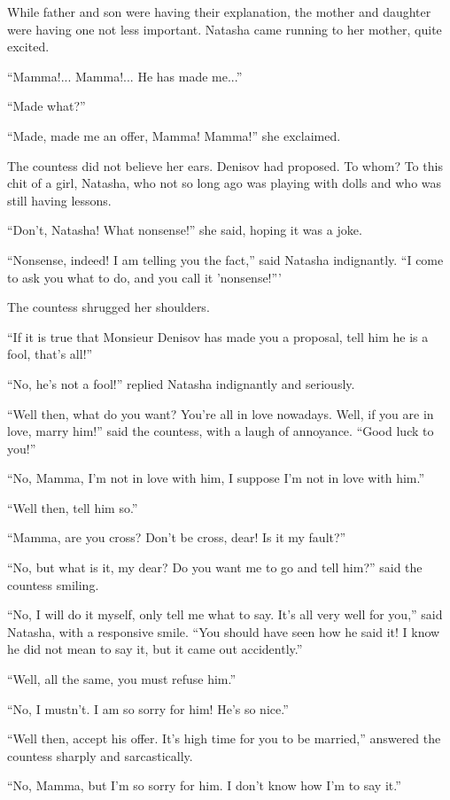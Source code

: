 While father and son were having their explanation, the mother
and daughter were having one not less important. Natasha came
running to her mother, quite excited.

``Mamma!... Mamma!... He has made me...''

``Made what?''

``Made, made me an offer, Mamma! Mamma!'' she exclaimed.

The countess did not believe her ears. Denisov had proposed. To
whom? To this chit of a girl, Natasha, who not so long ago was
playing with dolls and who was still having lessons.

``Don't, Natasha! What nonsense!'' she said, hoping it was a
joke.

``Nonsense, indeed! I am telling you the fact,'' said Natasha
indignantly.  ``I come to ask you what to do, and you call it
'nonsense!'''

The countess shrugged her shoulders.

``If it is true that Monsieur Denisov has made you a proposal,
tell him he is a fool, that's all!''

``No, he's not a fool!'' replied Natasha indignantly and
seriously.

``Well then, what do you want? You're all in love nowadays. Well,
if you are in love, marry him!'' said the countess, with a laugh
of annoyance.  ``Good luck to you!''

``No, Mamma, I'm not in love with him, I suppose I'm not in love
with him.''

``Well then, tell him so.''

``Mamma, are you cross? Don't be cross, dear! Is it my fault?''

``No, but what is it, my dear? Do you want me to go and tell
him?'' said the countess smiling.

``No, I will do it myself, only tell me what to say. It's all
very well for you,'' said Natasha, with a responsive smile. ``You
should have seen how he said it! I know he did not mean to say
it, but it came out accidently.''

``Well, all the same, you must refuse him.''

``No, I mustn't. I am so sorry for him! He's so nice.''

``Well then, accept his offer. It's high time for you to be
married,'' answered the countess sharply and sarcastically.

``No, Mamma, but I'm so sorry for him. I don't know how I'm to
say it.''

